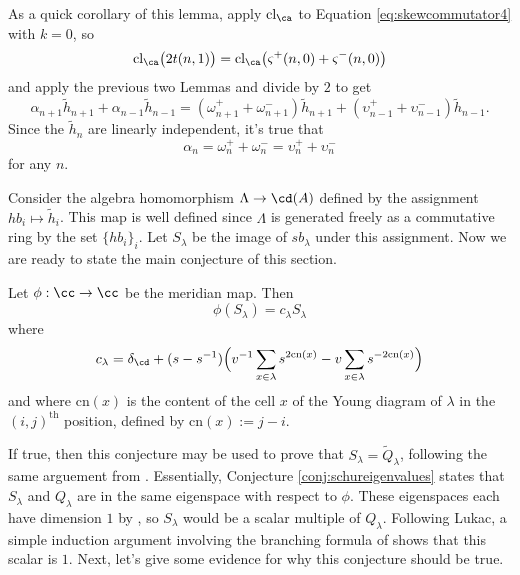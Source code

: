 \begin{remark}
As a quick corollary of this lemma, apply $\textrm{cl}_\ca$ to Equation \eqref{eq:skewcommutator4} with $k=0$, so
\[
\textrm{cl}_\ca \big( 2 t(n, 1) \big) = \textrm{cl}_\ca \big( \varsigma^+ (n, 0) + \varsigma^- (n, 0) \big)
\]
and apply the previous two Lemmas and divide by $2$ to get
\[
\alpha_{n+1} \tilde{h}_{n+1} + \alpha_{n-1} \tilde{h}_{n-1} = (\omega^+_{n+1} + \omega^-_{n+1}) \tilde{h}_{n+1} + (\upsilon^+_{n-1} + \upsilon^-_{n-1}) \tilde{h}_{n-1}.
\]
Since the $\tilde{h}_n$ are linearly independent, it's true that 
\begin{equation}
\alpha_n = \omega_n^+ + \omega_n^- = \upsilon_n^+ + \upsilon_n^-
\end{equation}
for any $n$. 
\end{remark}

Consider the algebra homomorphism $\Lambda \to \cd(A)$ defined by the assignment $hb_i \mapsto \tilde{h}_i$. This map is well defined since $\Lambda$ is generated freely as a commutative ring by the set $\{hb_i\}_{i}$. Let $S_\lambda$ be the image of $sb_\lambda$ under this assignment. Now we are ready to state the main conjecture of this section.
\begin{conjecture} \label{conj:schureigenvalues}
Let $\phi: \cc \to \cc$ be the meridian map.  Then
\begin{equation}
\phi ( S_\lambda ) = c_\lambda S_\lambda
\end{equation}
where
\begin{equation}
c_\lambda = \delta_\cd + ( s - s^{-1} ) \Big( v^{-1} \sum_{x \in \lambda} s^{2 \textrm{cn}(x)} - v \sum_{x \in \lambda} s^{-2 \textrm{cn}(x)} \Big)
\end{equation}
and where $\textrm{cn}(x)$ is the content of the cell $x$ of the Young diagram of $\lambda$ in the $(i,j)^{\textrm{th}}$ position, defined by $\textrm{cn}(x) := j-i$.
\end{conjecture}

If true, then this conjecture may be used to prove that $S_\lambda = \widetilde{Q}_\lambda$, following the same arguement from . Essentially, Conjecture \ref{conj:schureigenvalues} states that $S_\lambda$ and $Q_\lambda$ are in the same eigenspace with respect to $\phi$. These eigenspaces each have dimension $1$ by , so $S_\lambda$ would be a scalar multiple of $Q_\lambda$. Following Lukac, a simple induction argument involving the branching formula of  shows that this scalar is $1$. Next, let's give some evidence for why this conjecture should be true. 

